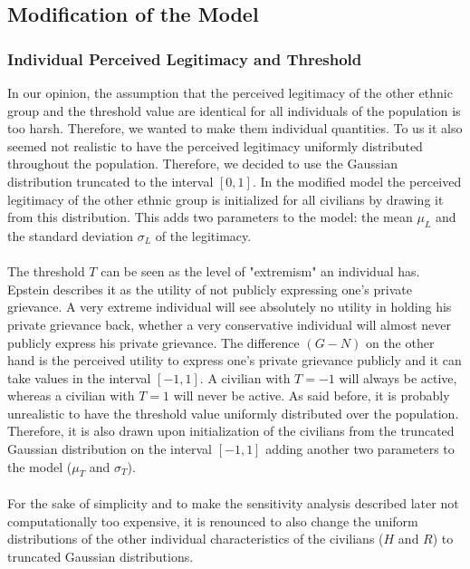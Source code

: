 \documentclass[11pt]{article}
\begin{document}
\subsection{Modification of the Model}

\subsubsection{Individual Perceived Legitimacy and Threshold}
In our opinion, the assumption that the perceived legitimacy of the other ethnic group and the threshold value are identical for all individuals of the population is too harsh. Therefore, we wanted to make them individual quantities. To us it also seemed not realistic to have the perceived legitimacy uniformly distributed throughout the population. Therefore, we decided to use the Gaussian distribution truncated to the interval $[0,1]$. In the modified model the perceived legitimacy of the other ethnic group is initialized for all civilians by drawing it from this distribution. This adds two parameters to the model: the mean $\mu_L$ and the standard deviation $\sigma_L$ of the legitimacy.\\
\\
The threshold $T$ can be seen as the level of "extremism" an individual has. Epstein describes it as the utility of not publicly expressing one's private grievance. A very extreme individual will see absolutely no utility in holding his private grievance back, whether a very conservative individual will almost never publicly express his private grievance. The difference $(G-N)$ on the other hand is the perceived utility to express one's private grievance publicly and it can take values in the interval $[-1,1]$. A civilian with $T = -1$ will always be active, whereas a civilian with $T = 1$ will never be active. As said before, it is probably unrealistic to have the threshold value uniformly distributed over the population. Therefore, it is also drawn upon initialization of the civilians from the truncated Gaussian distribution on the interval $[-1,1]$ adding another two parameters to the model ($\mu_T$ and $\sigma_T$).\\
\\
For the sake of simplicity and to make the sensitivity analysis described later not computationally too expensive, it is renounced to also change the uniform distributions of the other individual characteristics of the civilians ($H$ and $R$) to truncated Gaussian distributions.
\end{document}
